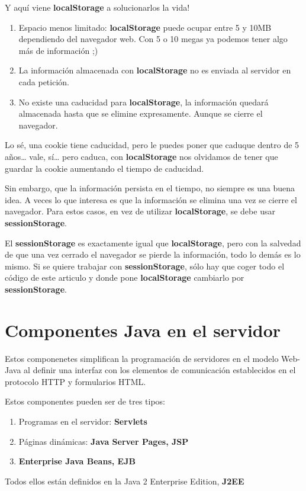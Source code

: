 \documentclass{apuntes}
\begin{document}
Y aquí viene \textbf{localStorage} a solucionarlos la vida!

\begin{enumerate}
\item Espacio menos limitado: \textbf{localStorage} puede ocupar entre 5 y 10MB dependiendo del navegador web. Con 5 o 10 megas ya podemos tener algo más de información ;)
\item La información almacenada con \textbf{localStorage} no es enviada al servidor en cada petición.
\item No existe una caducidad para \textbf{localStorage}, la información quedará almacenada hasta que se elimine expresamente. Aunque se cierre el navegador.
\end{enumerate}

Lo sé, una cookie tiene caducidad, pero le puedes poner que caduque dentro de 5 años… vale, sí… pero caduca, con \textbf{localStorage} nos olvidamos de tener que guardar la cookie aumentando el tiempo de caducidad.

Sin embargo, que la información persista en el tiempo, no siempre es una buena idea. A veces lo que interesa es que la información se elimina una vez se cierre el navegador. Para estos casos, en vez de utilizar \textbf{localStorage}, se debe usar \textbf{sessionStorage}.

El \textbf{sessionStorage} es exactamente igual que \textbf{localStorage}, pero con la salvedad de que una vez cerrado el navegador se pierde la información, todo lo demás es lo mismo. Si se quiere trabajar con \textbf{sessionStorage}, sólo hay que coger todo el código de este articulo y donde pone \textbf{localStorage} cambiarlo por \textbf{sessionStorage}.

\section{Componentes Java en el servidor}
Estos componenetes simplifican la programación de servidores en el modelo Web-Java al definir una interfaz con los elementos de comunicación establecidos en el protocolo HTTP y formularios HTML.

Estos componentes pueden ser de tres tipos:
\begin{enumerate}
\item Programas en el servidor: \textbf{Servlets}
\item Páginas dinámicas: \textbf{Java Server Pages, JSP}
\item \textbf{Enterprise Java Beans, EJB}
\end{enumerate}
Todos ellos están definidos en la Java 2 Enterprise Edition, \textbf{J2EE}
\end{document}
